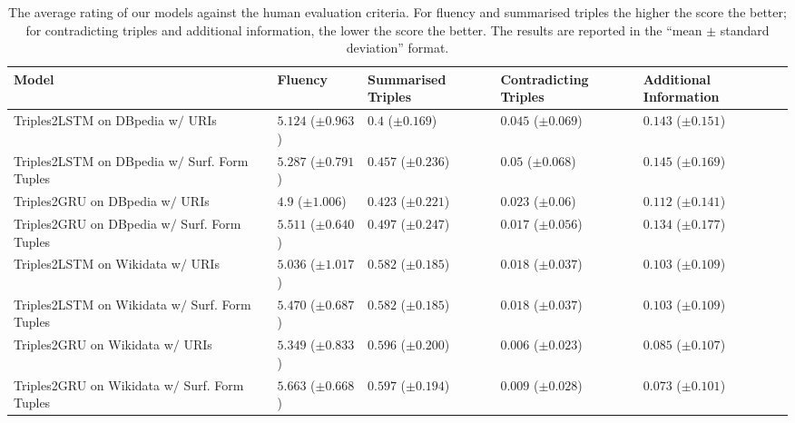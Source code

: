 \documentclass[preprint,5p]{elsarticle}
\begin{document}
\begin{table*}[t]
  \caption{The average rating of our models against the human evaluation criteria. For fluency and summarised triples the higher the score the better; for contradicting triples and additional information, the lower the score the better. The results are reported in the ``mean $\pm$ standard deviation'' format.} 
  \begin{center}
    \footnotesize
    {
    \setlength{\extrarowheight}{1.5pt}
    \begin{tabular}{|L{3cm}|C{2.55cm}|C{2.55cm}|C{2.55cm}|C{2.55cm}|}\hline
      \textbf{Model} & \textbf{Fluency} & \textbf{Summarised Triples} & \textbf{Contradicting Triples} & \textbf{Additional Information} \\ \hline 
      Triples2LSTM on DBpedia w$/$ URIs & $5.124$ ($\pm 0.963$) & $0.4$ ($\pm 0.169$) & $0.045$ ($\pm 0.069$) & $0.143$ ($\pm 0.151$) \\ \hline
      Triples2LSTM on DBpedia w$/$ Surf. Form Tuples & $5.287$ ($\pm 0.791$) & $0.457$ ($\pm 0.236$) & $0.05$ ($\pm 0.068$) & $0.145$ ($\pm 0.169$) \\ \hline
      Triples2GRU on DBpedia w$/$ URIs & $4.9$ ($\pm 1.006$) & $0.423$ ($\pm 0.221$) & $0.023$ ($\pm 0.06$) & $\mathbf{0.112}$ ($\pm 0.141$) \\ \hline
      Triples2GRU on DBpedia w$/$ Surf. Form Tuples & $\mathbf{5.511}$ ($\pm 0.640$) & $\mathbf{0.497}$ ($\pm 0.247$) & $\mathbf{0.017}$ ($\pm 0.056$) & $0.134$ ($\pm 0.177$) \\ \hline\hline

      
      Triples2LSTM on Wikidata w$/$ URIs & $5.036$ ($\pm 1.017$) & $0.582$ ($\pm 0.185$) & $0.018$ ($\pm 0.037$) & $0.103$ ($\pm 0.109$) \\ \hline
      Triples2LSTM on Wikidata w$/$ Surf. Form Tuples & $5.470$ ($\pm 0.687$) & $0.582$ ($\pm 0.185$) & $0.018$ ($\pm 0.037$) & $0.103$ ($\pm 0.109$) \\ \hline
      Triples2GRU on Wikidata w$/$ URIs & $5.349$ ($\pm 0.833$) & $0.596$ ($\pm 0.200$) & $\mathbf{0.006}$ ($\pm 0.023$) & $0.085$ ($\pm 0.107$) \\ \hline
      Triples2GRU on Wikidata w$/$ Surf. Form Tuples & $\mathbf{5.663}$ ($\pm 0.668$) & $\mathbf{0.597}$ ($\pm 0.194$) & $0.009$ ($\pm 0.028$) & $\mathbf{0.073}$ ($\pm 0.101$) \\ \hline
    \end{tabular}
    }
    \label{table:HumanEvaluation}
  \end{center}
\end{table*}
\end{document}
